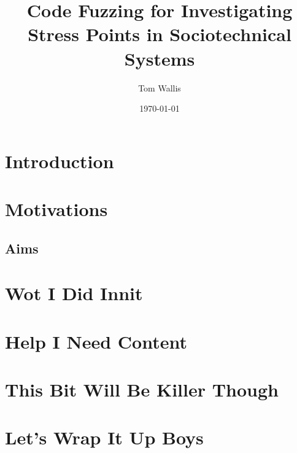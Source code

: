 \documentclass{l4proj}
\begin{document}
\title{Code Fuzzing for Investigating Stress Points in Sociotechnical Systems}  %
\author{Tom Wallis}
\date{\today}
\maketitle

\begin{abstract}

\end{abstract}

\educationalconsent
\tableofcontents

\chapter{Introduction}


\chapter{Motivations}

\section{Aims}


\chapter{Wot I Did Innit}


\chapter{Help I Need Content}


\chapter{This Bit Will Be Killer Though}


\chapter{Let's Wrap It Up Boys}

%

%
%
\end{document}
